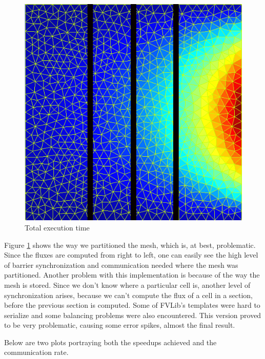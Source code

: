 \documentclass[a4paper,10pt,openright,openbib,twocolumn]{article}
\begin{document}
\begin{figure}[!htb]
    \centering
    \begin{minipage}[t]{\columnwidth}
        \includegraphics[width=\textwidth]{../images/mesh_vertical.png}
        \caption{Total execution time \label{fig:mes_vert}}
    \end{minipage}
\end{figure}

Figure \ref{fig:mes_vert} shows the way we partitioned the mesh, which is, at best, problematic. Since the fluxes are computed from right to left, one can easily see the high level of barrier synchronization and communication needed where the mesh was partitioned. Another problem with this implementation is because of the way the mesh is stored. Since we don't know where a particular cell is, another level of synchronization arises, because we can't compute the flux of a cell in a section, before the previous section is computed. 
Some of FVLib's templates were hard to serialize and some balancing problems were also encountered. This version proved to be very problematic, causing some error spikes, almost the final result.

Below are two plots portraying both the speedups achieved and the communication rate. 
\end{document}

